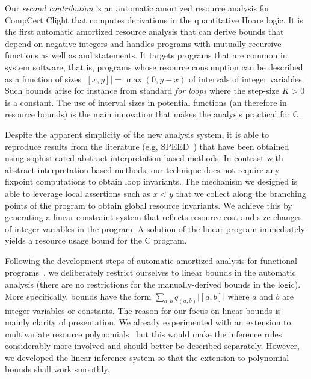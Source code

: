 \documentclass[nocopyrightspace,preprint]{sigplanconf}
\begin{document}
Our \emph{second contribution} is an automatic amortized resource
analysis for CompCert Clight that computes derivations in the
quantitative Hoare logic.  It is the first automatic amortized
resource analysis that can derive bounds that depend on negative
integers and handles programs with mutually recursive functions as well as
 and  statements.  It targets programs that
are common in system software, that is, programs whose resource
consumption can be described as a function of sizes $|[x,y]| =
\max(0,y-x)$ of intervals of integer variables.  Such bounds arise for
instance from standard \emph{for loops}  where the step-size $K>0$ is a constant.
%
The use of interval sizes in potential functions (an therefore in
resource bounds) is the main innovation that makes the analysis
practical for C.

Despite the apparent simplicity of the new analysis system, it is able
to reproduce results from the literature (e.g,
SPEED~\cite{GulwaniMC09}) that have been obtained using sophisticated
abstract-interpretation based methods.  In contrast with abstract-interpretation
based methods, our technique does not require any
fixpoint computations to obtain loop invariants.  The mechanism we
designed is able to leverage local assertions such as $x < y$ that we
collect along the branching points of the program to obtain global
resource invariants.  We achieve this by generating a linear
constraint system that reflects resource cost and size changes of
integer variables in the program.  A solution of the linear program
immediately yields a resource usage bound for the C
program.  %

Following the development steps of automatic amortized analysis for
functional programs~\cite{Jost03,HoffmannH10}, we deliberately
restrict ourselves to linear bounds in the automatic analysis (there
are no restrictions for the manually-derived bounds in the logic).
More specifically, bounds have the form $\sum_{a,b} q_{(a,b)} |[a,b]|$
where $a$ and $b$ are integer variables or constants.  The reason for
our focus on linear bounds is mainly clarity of presentation.  We
already experimented with an extension to multivariate resource
polynomials~\cite{HoffmannAH11} but this would make the inference
rules considerably more involved and should better be described
separately.  However, we developed the linear inference system so that
the extension to polynomial bounds shall work smoothly.
\end{document}
